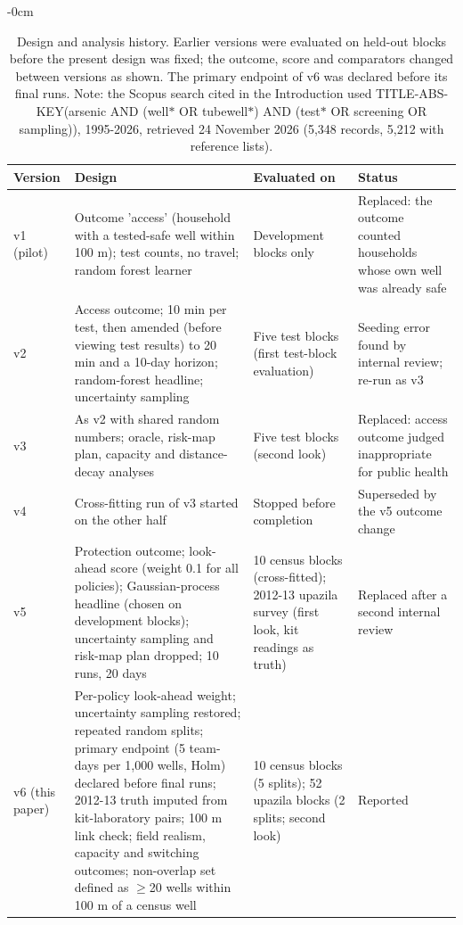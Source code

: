\documentclass[sustainability,article,submit,pdftex,moreauthors]{Definitions/mdpi}
\begin{document}
\begin{table}[H]
\caption{Design and analysis history. Earlier versions were evaluated on held-out blocks before the present design was fixed; the outcome, score and comparators changed between versions as shown. The primary endpoint of v6 was declared before its final runs. Note: the Scopus search cited in the Introduction used TITLE-ABS-KEY(arsenic AND (well$\ast$ OR tubewell$\ast$) AND (test$\ast$ OR screening OR sampling)), 1995-2026, retrieved 24 November 2026 (5,348 records, 5,212 with reference lists).}
\label{apptab4}
\scriptsize\setlength{\tabcolsep}{3pt}
\begin{adjustwidth}{-\extralength}{0cm}\centering
\begin{tabular}{L{1.6cm}L{8.0cm}L{3.8cm}L{3.6cm}}
\toprule
\textbf{Version} & \textbf{Design} & \textbf{Evaluated on} & \textbf{Status} \\
\midrule
v1 (pilot) & Outcome 'access' (household with a tested-safe well within 100 m); test counts, no travel; random forest learner & Development blocks only & Replaced: the outcome counted households whose own well was already safe \\
v2 & Access outcome; 10 min per test, then amended (before viewing test results) to 20 min and a 10-day horizon; random-forest headline; uncertainty sampling & Five test blocks (first test-block evaluation) & Seeding error found by internal review; re-run as v3 \\
v3 & As v2 with shared random numbers; oracle, risk-map plan, capacity and distance-decay analyses & Five test blocks (second look) & Replaced: access outcome judged inappropriate for public health \\
v4 & Cross-fitting run of v3 started on the other half & Stopped before completion & Superseded by the v5 outcome change \\
v5 & Protection outcome; look-ahead score (weight 0.1 for all policies); Gaussian-process headline (chosen on development blocks); uncertainty sampling and risk-map plan dropped; 10 runs, 20 days & 10 census blocks (cross-fitted); 2012-13 upazila survey (first look, kit readings as truth) & Replaced after a second internal review \\
v6 (this paper) & Per-policy look-ahead weight; uncertainty sampling restored; repeated random splits; primary endpoint (5 team-days per 1,000 wells, Holm) declared before final runs; 2012-13 truth imputed from kit-laboratory pairs; 100 m link check; field realism, capacity and switching outcomes; non-overlap set defined as $\geq$20 wells within 100 m of a census well & 10 census blocks (5 splits); 52 upazila blocks (2 splits; second look) & Reported \\
\bottomrule
\end{tabular}
\end{adjustwidth}
\end{table}
\end{document}
